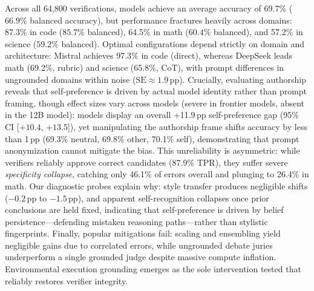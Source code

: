 Across all 64,800 verifications, models achieve an average accuracy of 69.7\% ($66.9\%$ balanced accuracy), but performance fractures heavily across domains: 87.3\% in code ($85.7\%$ balanced), 64.5\% in math ($60.4\%$ balanced), and 57.2\% in science ($59.2\%$ balanced). Optimal configurations depend strictly on domain and architecture: Mistral achieves 97.3\% in code (direct), whereas DeepSeek leads math (69.2\%, rubric) and science (65.8\%, CoT), with prompt differences in ungrounded domains within noise ($\text{SE} \approx 1.9$\,pp). Crucially, evaluating authorship reveals that self-preference is driven by actual model identity rather than prompt framing, though effect sizes vary across models (severe in frontier models, absent in the 12B model): models display an overall +11.9\,pp self-preference gap (95\% CI [$+10.4$, $+13.5$]), yet manipulating the authorship frame shifts accuracy by less than 1\,pp (69.3\% neutral, 69.8\% other, 70.1\% self), demonstrating that prompt anonymization cannot mitigate the bias. This unreliability is asymmetric: while verifiers reliably approve correct candidates (87.9\% TPR), they suffer severe \emph{specificity collapse}, catching only 46.1\% of errors overall and plunging to 26.4\% in math. Our diagnostic probes explain why: style transfer produces negligible shifts ($-0.2$\,pp to $-1.5$\,pp), and apparent self-recognition collapses once prior conclusions are held fixed, indicating that self-preference is driven by belief persistence---defending mistaken reasoning paths---rather than stylistic fingerprints. Finally, popular mitigations fail: scaling and ensembling yield negligible gains due to correlated errors, while ungrounded debate juries underperform a single grounded judge despite massive compute inflation. Environmental execution grounding emerges as the sole intervention tested that reliably restores verifier integrity.

